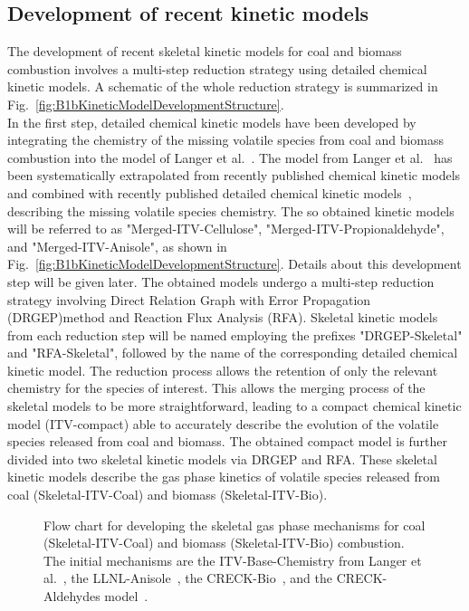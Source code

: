 \begin{refsection}
\subsection{Development of recent kinetic models}
The development of recent skeletal kinetic models for coal and biomass combustion involves a multi-step reduction strategy using detailed chemical kinetic models. A schematic of the whole reduction strategy is summarized in Fig.~\ref{fig:B1bKineticModelDevelopmentStructure}.
\\
In the first step, detailed chemical kinetic models have been developed by integrating the chemistry of the missing volatile species from coal and biomass combustion into the model of Langer et al.~\cite{Langer2023}. The model from Langer et al.~\cite{Langer2012} has been systematically extrapolated from recently published chemical kinetic models and combined with recently published detailed chemical kinetic models~\cite{Wagnon2018, Debiagi2016, Pelucchi2015}, describing the missing volatile species chemistry. The so obtained kinetic models will be referred to as "Merged-ITV-Cellulose", "Merged-ITV-Propionaldehyde", and "Merged-ITV-Anisole", as shown in Fig.~\ref{fig:B1bKineticModelDevelopmentStructure}. Details about this development step will be given later. The obtained models undergo a multi-step reduction strategy involving Direct Relation Graph with Error Propagation (DRGEP)method and Reaction Flux Analysis (RFA). Skeletal kinetic models from each reduction step will be named employing the prefixes "DRGEP-Skeletal" and "RFA-Skeletal", followed by the name of the corresponding detailed chemical kinetic model. The reduction process allows the retention of only the relevant chemistry for the species of interest. This allows the merging process of the skeletal models to be more straightforward, leading to a compact chemical kinetic model (ITV-compact) able to accurately describe the evolution of the volatile species released from coal and biomass. The obtained compact model is further divided into two skeletal kinetic models via DRGEP and RFA. These skeletal kinetic models describe the gas phase kinetics of volatile species released from coal (Skeletal-ITV-Coal) and biomass (Skeletal-ITV-Bio).
\begin{figure}[h]
  \centering
  \caption{Flow chart for developing the skeletal gas phase mechanisms for coal (Skeletal-ITV-Coal) and biomass (Skeletal-ITV-Bio) combustion. The initial mechanisms are the ITV-Base-Chemistry from Langer et al.~\cite{Langer2023}, the LLNL-Anisole~\cite{Wagnon2018}, the CRECK-Bio~\cite{Debiagi2016}, and the CRECK-Aldehydes model~\cite{Pelucchi2015}.}

\end{figure}
\end{refsection}
